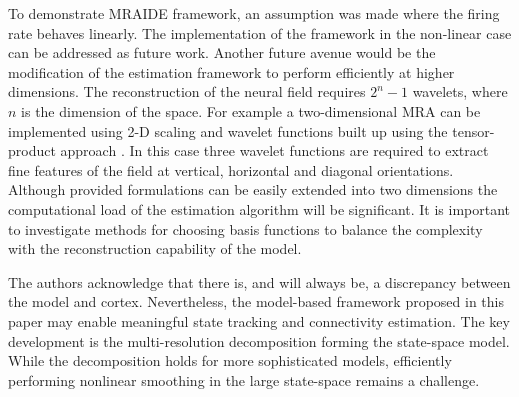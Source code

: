 \documentclass[review,authoryear,3p]{elsarticle}
\newcommand{\parham}[1]{\textcolor{red}{#1}}
\begin{document}


To demonstrate MRAIDE framework, an assumption was made where the firing rate behaves linearly. The implementation of the framework in the non-linear case can be addressed as future work. Another future avenue would be the modification of the estimation framework to perform efficiently at higher dimensions. The reconstruction of the neural field requires $2^n-1$ wavelets, where $n$ is the dimension of the space. For example a two-dimensional MRA can be implemented using 2-D scaling and wavelet functions built up using the tensor-product approach \citep{Meyer1992}. In this case three wavelet functions are required to  extract fine features of the field at vertical, horizontal and diagonal orientations. Although provided formulations can be easily extended into two dimensions the  computational load of the estimation algorithm will be significant. It is important to investigate methods for choosing basis functions to balance the complexity with the reconstruction capability of the model.
 
The authors acknowledge that there is, and will always be, a discrepancy between the model and cortex. Nevertheless, the model-based framework proposed in this paper may enable meaningful state tracking and connectivity estimation. The key development is the multi-resolution decomposition forming the state-space model. While the decomposition holds for more sophisticated models, efficiently performing nonlinear smoothing in the large state-space remains a challenge. 
\end{document}
